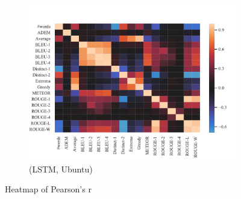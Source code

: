 \begin{figure}[htbp]
\begin{subfigure}{0.40\linewidth}
        \includegraphics[width=\linewidth]{figure/plot/heatmap/v2/pearson/lstm/ubuntu/plot.pdf}
        \caption{(LSTM, Ubuntu)}
    \end{subfigure}
    \caption{Heatmap of Pearson's r}
    \label{fig:corr_heatmap}
\end{figure}
